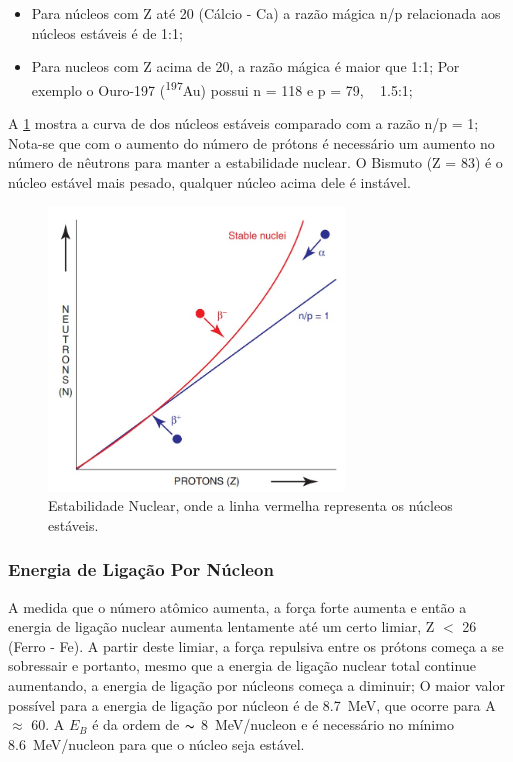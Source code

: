 \documentclass[11pt,a4paper]{article}
\newcounter{exemplo}
\begin{document}
                \begin{itemize}
                    \item Para núcleos com Z até 20 (Cálcio - Ca) a razão mágica n/p relacionada aos núcleos estáveis é de 1:1;
                    \item Para nucleos com Z acima de 20, a razão mágica é maior que 1:1; Por exemplo o Ouro-197 (\textsuperscript{197}Au)  possui n = 118 e p = 79, ~ 1.5:1;
                \end{itemize}

                A \ref{fig:estabilidadeNuclear} mostra a curva de dos núcleos estáveis comparado com a razão n/p = 1; Nota-se que com o aumento do número de prótons é necessário um aumento no número de nêutrons para manter a estabilidade nuclear. O Bismuto (Z = 83) é o núcleo estável mais pesado, qualquer núcleo acima dele é instável.

                \begin{figure}[h]
                    \centering
                    \includegraphics[width=0.7\textwidth]{Imagens/graficoNucleosEstaveis.jpg}
                    \caption{Estabilidade Nuclear, onde a linha vermelha representa os núcleos estáveis.}
                    \label{fig:estabilidadeNuclear}
                \end{figure}
        
            \subsubsection{Energia de Ligação Por Núcleon}
                
                A medida que o número atômico aumenta, a força forte aumenta e então a energia de ligação nuclear aumenta lentamente até um certo limiar, Z $<$ 26 (Ferro - Fe). A partir deste limiar, a força repulsiva entre os prótons começa a se sobressair e portanto, mesmo que a energia de ligação nuclear total continue aumentando, a energia de ligação por núcleons começa a diminuir; O maior valor possível para a energia de ligação por núcleon é de  \qty{8.7}{MeV}, que ocorre para A $\approx$ 60. A $E_B$ é da ordem de $\thicksim$ \qty{8}{MeV/nucleon} e é necessário no mínimo \qty{8.6}{MeV/nucleon} para que o núcleo seja estável.
\end{document}
